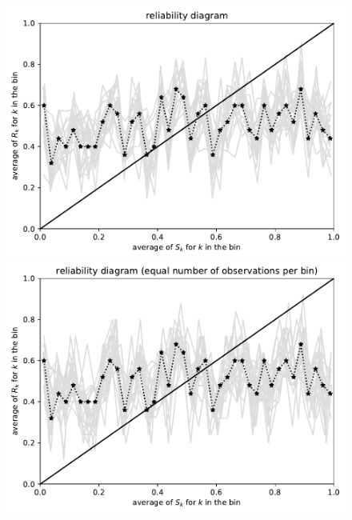 \documentclass{article}
\begin{document}
\begin{figure}
\begin{centering}
\parbox{\imsize}{\includegraphics[width=\imsize]
                {./codes/unweighted/1000_40_0_0/equiprob.pdf}}
\quad\quad
\parbox{\imsize}{\includegraphics[width=\imsize]
                {./codes/unweighted/1000_40_0_0/equisamp.pdf}}

\vspace{\vertsep}


\end{centering}
\end{figure}
\end{document}

